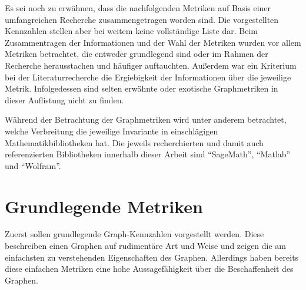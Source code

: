 \documentclass[a4paper,12pt,ngerman,chapterprefix=false,listof=totoc,bibliography=totoc]{scrreprt}
\begin{document}
{Es sei noch zu erwähnen, dass die nachfolgenden Metriken auf Basis einer umfangreichen Recherche zusammengetragen worden sind. Die vorgestellten Kennzahlen stellen aber bei weitem keine vollständige Liste dar. Beim Zusammentragen der Informationen und der Wahl der Metriken wurden vor allem Metriken betrachtet, die entweder grundlegend sind oder im Rahmen der Recherche herausstachen und häufiger auftauchten. Außerdem war ein Kriterium bei der Literaturrecherche die Ergiebigkeit der Informationen über die jeweilige Metrik. Infolgedessen sind selten erwähnte oder exotische Graphmetriken in dieser Auflistung nicht zu finden.

Während der Betrachtung der Graphmetriken wird unter anderem betrachtet, welche Verbreitung die jeweilige Invariante in einschlägigen Mathematikbibliotheken hat. Die jeweils recherchierten und damit auch referenzierten Bibliotheken innerhalb dieser Arbeit sind "`SageMath"', "`Matlab"' und "`Wolfram"'.
}
\section{Grundlegende Metriken}
{
Zuerst sollen grundlegende Graph-Kennzahlen vorgestellt werden. Diese beschreiben einen Graphen auf rudimentäre Art und Weise und zeigen die am einfachsten zu verstehenden Eigenschaften des Graphen. Allerdings haben bereits diese einfachen Metriken eine hohe Aussagefähigkeit über die Beschaffenheit des Graphen.
}
\end{document}
